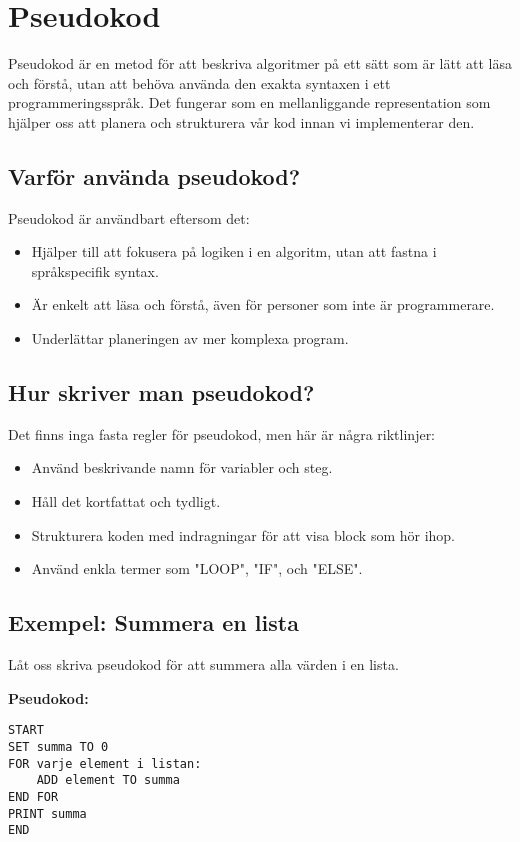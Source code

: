 \section{Pseudokod}
\label{section:psuedocode}
Pseudokod är en metod för att beskriva algoritmer på ett sätt som är lätt att läsa och förstå, utan att behöva använda den exakta syntaxen i ett programmeringsspråk. Det fungerar som en mellanliggande representation som hjälper oss att planera och strukturera vår kod innan vi implementerar den.

\subsection{Varför använda pseudokod?}
Pseudokod är användbart eftersom det:
\begin{itemize}
    \item Hjälper till att fokusera på logiken i en algoritm, utan att fastna i språkspecifik syntax.
    \item Är enkelt att läsa och förstå, även för personer som inte är programmerare.
    \item Underlättar planeringen av mer komplexa program.
\end{itemize}

\subsection{Hur skriver man pseudokod?}
Det finns inga fasta regler för pseudokod, men här är några riktlinjer:
\begin{itemize}
    \item Använd beskrivande namn för variabler och steg.
    \item Håll det kortfattat och tydligt.
    \item Strukturera koden med indragningar för att visa block som hör ihop.
    \item Använd enkla termer som "LOOP", "IF", och "ELSE".
\end{itemize}

\subsection{Exempel: Summera en lista}
Låt oss skriva pseudokod för att summera alla värden i en lista.

\textbf{Pseudokod:}
\begin{verbatim}
START
SET summa TO 0
FOR varje element i listan:
    ADD element TO summa
END FOR
PRINT summa
END
\end{verbatim}

